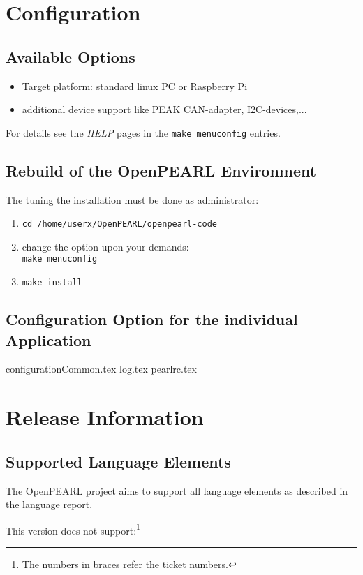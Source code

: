 \documentclass[10pt]{scrbook}
\begin{document}
\chapter{Configuration}
\section{Available Options}
\begin{itemize}
\item Target platform: standard linux PC or Raspberry Pi
\item additional device support like PEAK CAN-adapter, I2C-devices,...
\end{itemize}
For details see the {\em HELP} pages in the \verb|make menuconfig| 
entries.

\section{Rebuild of the OpenPEARL Environment}
The tuning the installation must be done as administrator:
\begin{enumerate}
\item \verb|cd /home/userx/OpenPEARL/openpearl-code|
\item change the option upon your demands:\\
      \verb|make menuconfig| 
\item \verb|make install|
\end{enumerate}

\section{Configuration Option for the individual Application}
{configurationCommon.tex}
{log.tex}
{pearlrc.tex}

\chapter{Release Information}
\section{Supported Language Elements}
The OpenPEARL project aims to support all language elements  as
described in the language report.

This version does not support:\footnote{The numbers in braces refer the ticket numbers.}
\end{document}
